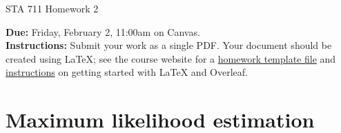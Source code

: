 \documentclass[11pt]{article}
\begin{document}
\begin{center}
\Large
STA 711 Homework 2\\
\normalsize
\vspace{5mm}
\end{center}

\noindent \textbf{Due:} Friday, February 2, 11:00am on Canvas.\\ 

\noindent \textbf{Instructions:} Submit your work as a single PDF. Your document should be created using LaTeX; see the course website for a \href{https://sta711-s24.github.io/homework/hw_template.tex}{homework template file} and \href{https://sta711-s24.github.io/homework/latex_instructions/}{instructions} on getting started with LaTeX and Overleaf.

\section*{Maximum likelihood estimation}
\end{document}
